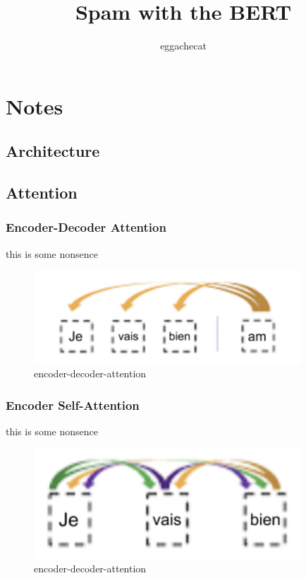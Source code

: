 \documentclass[]{article}
\title{Spam with the BERT}
\author{eggachecat}
\date{}
\numberwithin{equation}{subsection}
\begin{document}
	
	\maketitle
	
	\newcommand{\norm}[1]{\left\lVert#1\right\rVert}
	\newcommand{\abs}[1]{\lvert#1\rvert}
	
	\newcommand{\argminE}{\mathop{\mathrm{argmin}}}          %
	\newcommand{\argminF}{\mathop{\mathrm{argmin}}\limits}   %
	
	\section{Notes}
	\subsection{Architecture}
	\subsection{Attention}
	\subsubsection{Encoder-Decoder Attention}
		this is some nonsence
	\begin{figure}[!htb]
		\centering
		\includegraphics[width=10cm]{./assets/encoder-decoder-attention.png}
		\caption{encoder-decoder-attention}
		\label{fid:encoder-decoder-attention}
	\end{figure}
	\subsubsection{Encoder Self-Attention}
	this is some nonsence
	\begin{figure}[!htb]
		\centering
		\includegraphics[width=10cm]{./assets/encoder-self-attention.png}
		\caption{encoder-decoder-attention}
		\label{fid:encoder-self-attention}
	\end{figure}
\end{document}
